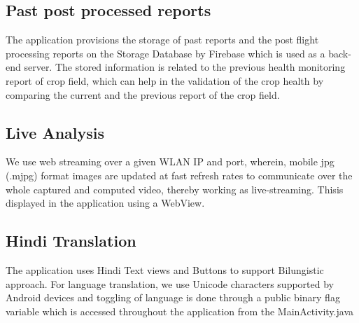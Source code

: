 \subsection{Past post processed reports} The application provisions the storage of past reports and the post flight processing reports on the Storage Database by Firebase which is used as a back-end server. The stored information is related to the previous health monitoring report of crop field, which can help in the validation of the crop health by comparing the current and the previous report of the crop field.

\subsection{Live Analysis}We use web streaming over a given WLAN IP and port, wherein, mobile jpg (.mjpg) format images are updated at fast refresh rates to communicate over the whole captured and computed video, thereby working as live-streaming. Thisis displayed in the application using a WebView.


\subsection{Hindi Translation}The application uses Hindi Text views and Buttons to support Bilungistic approach. For language translation, we use Unicode characters supported by Android devices and toggling of language is done through a public binary flag variable which is accessed throughout the application from the MainActivity.java

